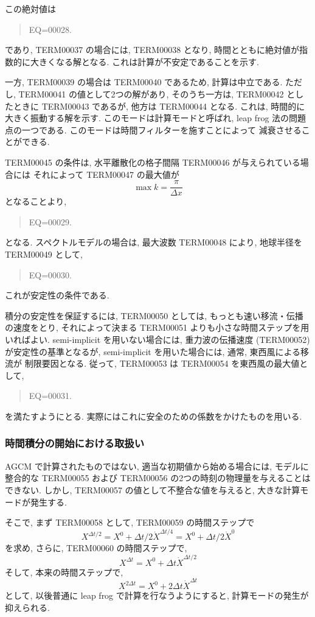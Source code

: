 この絶対値は
\begin{quote}
EQ=00028.
\end{quote}
であり, TERM00037 の場合には, TERM00038 となり,
時間とともに絶対値が指数的に大きくなる解となる.
これは計算が不安定であることを示す.

一方, TERM00039 の場合は TERM00040 であるため,
計算は中立である.
ただし, TERM00041 の値として2つの解があり,
そのうち一方は, TERM00042 としたときに
TERM00043 であるが, 
他方は TERM00044 となる.
これは, 時間的に大きく振動する解を示す.
このモードは計算モードと呼ばれ, 
leap frog 法の問題点の一つである.
このモードは時間フィルターを施すことによって
減衰させることができる.

TERM00045 の条件は,
水平離散化の格子間隔 TERM00046 が与えられている場合には
それによって TERM00047 の最大値が
\begin{displaymath}
  \max k = \frac{\pi}{\Delta x}
\end{displaymath}
となることより,
\begin{quote}
EQ=00029.
\end{quote}
となる.
スペクトルモデルの場合は, 最大波数 TERM00048 により,
地球半径を TERM00049 として,
\begin{quote}
EQ=00030.
\end{quote}
これが安定性の条件である.

積分の安定性を保証するには,
TERM00050 としては, もっとも速い移流・伝播の速度をとり,
それによって決まる TERM00051 よりも小さな時間ステップを用いればよい.
semi-implicit を用いない場合には, 重力波の伝播速度
(TERM00052) が安定性の基準となるが,
semi-implicit を用いた場合には, 通常, 東西風による移流が
制限要因となる.
従って, TERM00053 は TERM00054 を東西風の最大値として,
\begin{quote}
EQ=00031.
\end{quote}
を満たすようにとる.
実際にはこれに安全のための係数をかけたものを用いる.

\subsubsection{時間積分の開始における取扱い}

AGCM で計算されたものではない, 
適当な初期値から始める場合には, モデルに整合的な
TERM00055 および TERM00056 の2つの時刻の物理量を与えることはできない.
しかし, TERM00057 の値として不整合な値を与えると,
大きな計算モードが発生する.

そこで, まず TERM00058 として, TERM00059 の時間ステップで
\begin{displaymath}
  X^{\Delta t/2} = X^0 + \Delta t/2 \dot{X}^{\Delta t/4}
                 = X^0 + \Delta t/2 \dot{X}^0
\end{displaymath}
を求め, さらに, TERM00060 の時間ステップで,
\begin{displaymath}
  X^{\Delta t}   = X^0 + \Delta t \dot{X}^{\Delta t/2}
\end{displaymath}
そして, 本来の時間ステップで,
\begin{displaymath}
  X^{2\Delta t}   = X^0 + 2 \Delta t \dot{X}^{\Delta t}
\end{displaymath}
として, 以後普通に leap frog で計算を行なうようにすると,
計算モードの発生が抑えられる.

